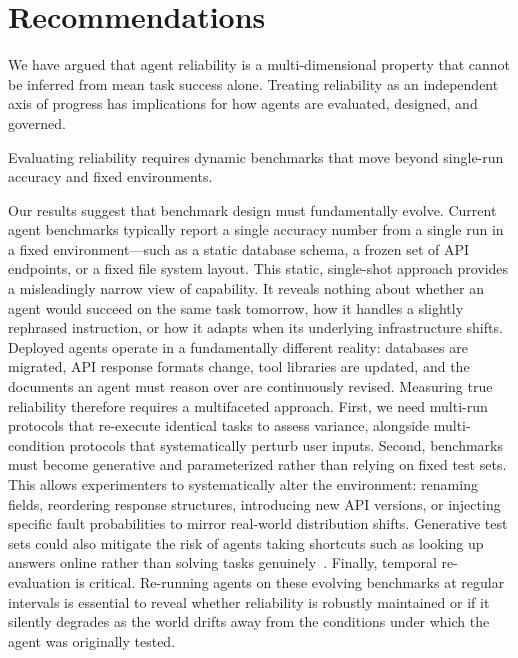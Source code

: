 \documentclass[11pt]{article}
\newcounter{dimension}
\newcounter{recommendation}
\begin{document}
\section{Recommendations}
\label{sec:recommendations}

We have argued that agent reliability is a multi-dimensional property that cannot be inferred from mean task success alone. Treating reliability as an independent axis of progress has implications for how agents are evaluated, designed, and governed.

\begin{claimbox}
Evaluating reliability requires dynamic benchmarks that move beyond single-run accuracy and fixed environments.
\end{claimbox}
Our results suggest that benchmark design must fundamentally evolve. Current agent benchmarks typically report a single accuracy number from a single run in a fixed environment—such as a static database schema, a frozen set of API endpoints, or a fixed file system layout. This static, single-shot approach provides a misleadingly narrow view of capability. It reveals nothing about whether an agent would succeed on the same task tomorrow, how it handles a slightly rephrased instruction, or how it adapts when its underlying infrastructure shifts. Deployed agents operate in a fundamentally different reality: databases are migrated, API response formats change, tool libraries are updated, and the documents an agent must reason over are continuously revised. Measuring true reliability therefore requires a multifaceted approach. First, we need multi-run protocols that re-execute identical tasks to assess variance, alongside multi-condition protocols that systematically perturb user inputs. Second, benchmarks must become generative and parameterized rather than relying on fixed test sets. This allows experimenters to systematically alter the environment: renaming fields, reordering response structures, introducing new API versions, or injecting specific fault probabilities to mirror real-world distribution shifts. Generative test sets could also mitigate the risk of agents taking shortcuts such as looking up answers online rather than solving tasks genuinely~\citep{kapoor2025holistic}. Finally, temporal re-evaluation is critical. Re-running agents on these evolving benchmarks at regular intervals is essential to reveal whether reliability is robustly maintained or if it silently degrades as the world drifts away from the conditions under which the agent was originally tested.
\end{document}

